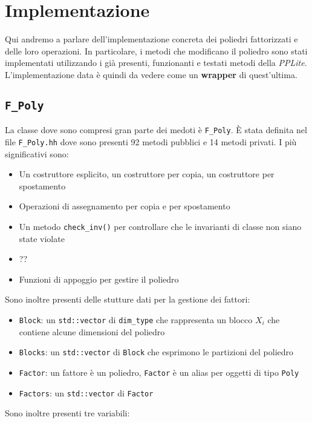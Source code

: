 \documentclass{mimosis}
\theoremstyle{definition}
\begin{document}
\chapter{Implementazione}
\label{sec:org80082f5}
Qui andremo a parlare dell'implementazione concreta dei poliedri fattorizzati e
delle loro operazioni. In particolare, i metodi che modificano il poliedro
sono stati implementati utilizzando i già presenti, funzionanti e testati metodi
della \emph{PPLite}. L'implementazione data è quindi da vedere come un \textbf{wrapper} di
quest'ultima.

\section{\texttt{F\_Poly}}
\label{sec:org5eb1fcf}
La classe dove sono compresi gran parte dei medoti è \texttt{F\_Poly}. È stata
definita nel file \texttt{F\_Poly.hh} dove sono presenti 92 metodi pubblici e 14 metodi
privati. I più significativi sono:

\begin{itemize}
\item Un costruttore esplicito, un costruttore per copia, un costruttore per spostamento
\item Operazioni di assegnamento per copia e per spostamento
\item Un metodo \texttt{check\_inv()} per controllare che le invarianti di classe non siano
state violate
\item ??
\item Funzioni di appoggio per gestire il poliedro
\end{itemize}

Sono inoltre presenti delle stutture dati per la gestione dei fattori:

\begin{itemize}
\item \texttt{Block}: un \texttt{std::vector} di \texttt{dim\_type} che rappresenta un blocco \(X_i\) che
contiene alcune dimensioni del poliedro
\item \texttt{Blocks}: un \texttt{std::vector} di \texttt{Block} che esprimono le partizioni del poliedro
\item \texttt{Factor}: un fattore è un poliedro, \texttt{Factor} è un alias per oggetti di tipo \texttt{Poly}
\item \texttt{Factors}: un \texttt{std::vector} di \texttt{Factor}
\end{itemize}

Sono inoltre presenti tre variabili:
\end{document}
